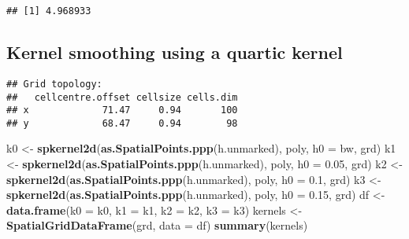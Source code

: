 \documentclass[]{article}
\newenvironment{Shaded}{\begin{snugshade}}{\end{snugshade}}
\newcommand{\DataTypeTok}[1]{\textcolor[rgb]{0.13,0.29,0.53}{#1}}
\newcommand{\DecValTok}[1]{\textcolor[rgb]{0.00,0.00,0.81}{#1}}
\newcommand{\FloatTok}[1]{\textcolor[rgb]{0.00,0.00,0.81}{#1}}
\newcommand{\KeywordTok}[1]{\textcolor[rgb]{0.13,0.29,0.53}{\textbf{#1}}}
\newcommand{\NormalTok}[1]{#1}
\newcommand{\OperatorTok}[1]{\textcolor[rgb]{0.81,0.36,0.00}{\textbf{#1}}}
\newcommand{\StringTok}[1]{\textcolor[rgb]{0.31,0.60,0.02}{#1}}
\begin{document}
\begin{verbatim}
## [1] 4.968933
\end{verbatim}

\hypertarget{kernel-smoothing-using-a-quartic-kernel}{%
\subsection{Kernel smoothing using a quartic
kernel}\label{kernel-smoothing-using-a-quartic-kernel}}

\begin{Shaded}
\end{Shaded}

\begin{verbatim}
## Grid topology:
##   cellcentre.offset cellsize cells.dim
## x             71.47     0.94       100
## y             68.47     0.94        98
\end{verbatim}

\begin{Shaded}
\begin{Highlighting}[]
\NormalTok{k0 <-}\StringTok{ }\KeywordTok{spkernel2d}\NormalTok{(}\KeywordTok{as.SpatialPoints.ppp}\NormalTok{(h.unmarked), poly, }\DataTypeTok{h0 =}\NormalTok{ bw, grd)}
\NormalTok{k1 <-}\StringTok{ }\KeywordTok{spkernel2d}\NormalTok{(}\KeywordTok{as.SpatialPoints.ppp}\NormalTok{(h.unmarked), poly, }\DataTypeTok{h0 =} \FloatTok{0.05}\NormalTok{, grd)}
\NormalTok{k2 <-}\StringTok{ }\KeywordTok{spkernel2d}\NormalTok{(}\KeywordTok{as.SpatialPoints.ppp}\NormalTok{(h.unmarked), poly, }\DataTypeTok{h0 =} \FloatTok{0.1}\NormalTok{, grd)}
\NormalTok{k3 <-}\StringTok{ }\KeywordTok{spkernel2d}\NormalTok{(}\KeywordTok{as.SpatialPoints.ppp}\NormalTok{(h.unmarked), poly, }\DataTypeTok{h0 =} \FloatTok{0.15}\NormalTok{, grd)}
\NormalTok{df <-}\StringTok{ }\KeywordTok{data.frame}\NormalTok{(}\DataTypeTok{k0 =}\NormalTok{ k0, }\DataTypeTok{k1 =}\NormalTok{ k1, }\DataTypeTok{k2 =}\NormalTok{ k2, }\DataTypeTok{k3 =}\NormalTok{ k3)}
\NormalTok{kernels <-}\StringTok{ }\KeywordTok{SpatialGridDataFrame}\NormalTok{(grd, }\DataTypeTok{data =}\NormalTok{ df)}
\KeywordTok{summary}\NormalTok{(kernels)}
\end{Highlighting}
\end{Shaded}
\end{document}
